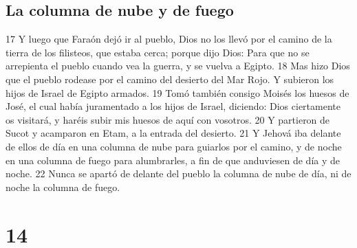 \section*{La columna de nube y de fuego}
17 Y luego que Faraón dejó ir al pueblo, Dios no los llevó por el camino de la tierra de los filisteos, que estaba cerca; porque dijo Dios: Para que no se arrepienta el pueblo cuando vea la guerra, y se vuelva a Egipto.
18 Mas hizo Dios que el pueblo rodease por el camino del desierto del Mar Rojo. Y subieron los hijos de Israel de Egipto armados.
19 Tomó también consigo Moisés los huesos de José, el cual había juramentado a los hijos de Israel, diciendo: Dios ciertamente os visitará, y haréis subir mis huesos de aquí con vosotros.
20 Y partieron de Sucot y acamparon en Etam, a la entrada del desierto.
21 Y Jehová iba delante de ellos de día en una columna de nube para guiarlos por el camino, y de noche en una columna de fuego para alumbrarles, a fin de que anduviesen de día y de noche.
22 Nunca se apartó de delante del pueblo la columna de nube de día, ni de noche la columna de fuego.

\chapter{14}

